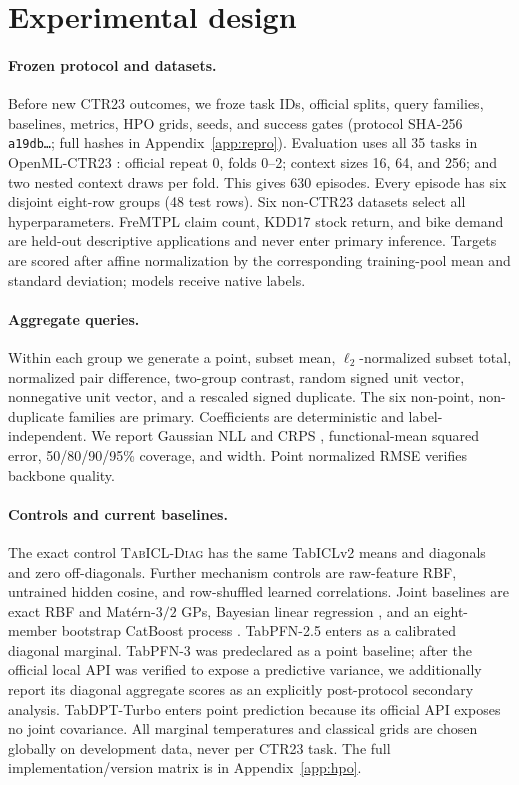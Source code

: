 \documentclass{article}
\newcommand{\diagbase}{\textsc{TabICL-Diag}}
\begin{document}
\section{Experimental design}

\paragraph{Frozen protocol and datasets.}
Before new CTR23 outcomes, we froze task IDs, official splits, query families,
baselines, metrics, HPO grids, seeds, and success gates (protocol SHA-256
\texttt{a19db\ldots}; full hashes in Appendix~\ref{app:repro}).  Evaluation
uses all 35 tasks in OpenML-CTR23 \citep{fischer2023ctr23}: official repeat 0,
folds 0--2; context sizes 16, 64, and 256; and two nested context draws per
fold.  This gives 630 episodes.  Every episode has six disjoint eight-row
groups (48 test rows).  Six non-CTR23 datasets select all hyperparameters.
FreMTPL claim count, KDD17 stock return, and bike demand are held-out
descriptive applications and never enter primary inference.  Targets are
scored after affine normalization by the corresponding training-pool mean and
standard deviation; models receive native labels.

\paragraph{Aggregate queries.}
Within each group we generate a point, subset mean, $\ell_2$-normalized subset
total, normalized pair difference, two-group contrast, random signed unit
vector, nonnegative unit vector, and a rescaled signed duplicate.  The six
non-point, non-duplicate families are primary.  Coefficients are deterministic
and label-independent.  We report Gaussian NLL and CRPS
\citep{gneiting2007proper}, functional-mean squared error, 50/80/90/95\%
coverage, and width.  Point normalized RMSE verifies backbone quality.

\paragraph{Controls and current baselines.}
The exact control \diagbase{} has the same TabICLv2 means and diagonals and zero
off-diagonals.  Further mechanism controls are raw-feature RBF, untrained
hidden cosine, and row-shuffled learned correlations.  Joint baselines are
exact RBF and Mat\'ern-$3/2$ GPs, Bayesian linear regression
\citep{mackay1992bayesian}, and an eight-member bootstrap CatBoost process
\citep{prokhorenkova2018catboost}.  TabPFN-2.5 enters as a calibrated diagonal
marginal.  TabPFN-3 was predeclared as a point baseline; after the official
local API was verified to expose a predictive variance, we additionally report
its diagonal aggregate scores as an explicitly post-protocol secondary
analysis.  TabDPT-Turbo enters point prediction because its official API
exposes no joint covariance.  All marginal temperatures and
classical grids are chosen globally on development data, never per CTR23 task.
The full implementation/version matrix is in Appendix~\ref{app:hpo}.
\end{document}
